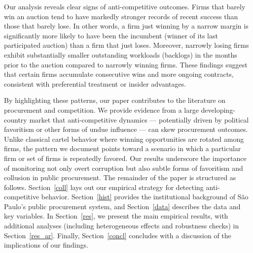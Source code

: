 Our analysis reveals clear signs of anti-competitive outcomes. Firms that barely win an auction tend to have markedly stronger records of recent success than those that barely lose. In other words, a firm just winning by a narrow margin is significantly more likely to have been the incumbent (winner of its last participated auction) than a firm that just loses. Moreover, narrowly losing firms exhibit substantially smaller outstanding workloads (backlogs) in the months prior to the auction compared to narrowly winning firms. These findings suggest that certain firms accumulate consecutive wins and more ongoing contracts, consistent with preferential treatment or insider advantages.

By highlighting these patterns, our paper contributes to the literature on procurement and competition. We provide evidence from a large developing-country market that anti-competitive dynamics --- potentially driven by political favoritism or other forms of undue influence --- can skew procurement outcomes. Unlike classical cartel behavior where winning opportunities are rotated among firms, the pattern we document points toward a scenario in which a particular firm or set of firms is repeatedly favored. Our results underscore the importance of monitoring not only overt corruption but also subtle forms of favoritism and collusion in public procurement. The remainder of the paper is structured as follows. Section~\ref{coll} lays out our empirical strategy for detecting anti-competitive behavior. Section~\ref{hist} provides the institutional background of São Paulo's public procurement system, and Section~\ref{data} describes the data and key variables. In Section~\ref{res}, we present the main empirical results, with additional analyses (including heterogeneous effects and robustness checks) in Section~\ref{res_ar}. Finally, Section~\ref{concl} concludes with a discussion of the implications of our findings.
